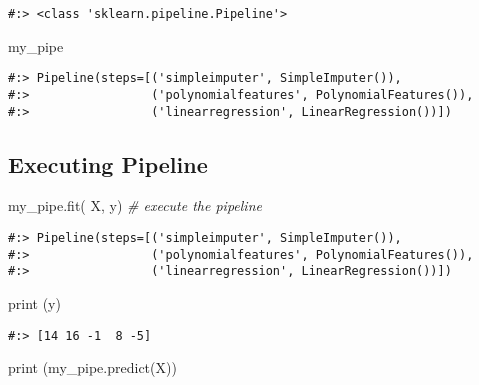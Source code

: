 \documentclass[
]{book}
\newenvironment{Shaded}{\begin{snugshade}}{\end{snugshade}}
\newcommand{\BuiltInTok}[1]{#1}
\newcommand{\CommentTok}[1]{\textcolor[rgb]{0.37,0.37,0.37}{\textit{#1}}}
\newcommand{\NormalTok}[1]{#1}
\begin{document}
\begin{verbatim}
#:> <class 'sklearn.pipeline.Pipeline'>
\end{verbatim}

\begin{Shaded}
\begin{Highlighting}[]
\NormalTok{my\_pipe}
\end{Highlighting}
\end{Shaded}

\begin{verbatim}
#:> Pipeline(steps=[('simpleimputer', SimpleImputer()),
#:>                 ('polynomialfeatures', PolynomialFeatures()),
#:>                 ('linearregression', LinearRegression())])
\end{verbatim}

\hypertarget{executing-pipeline}{%
\subsection{Executing Pipeline}\label{executing-pipeline}}

\begin{Shaded}
\begin{Highlighting}[]
\NormalTok{my\_pipe.fit( X, y) }\CommentTok{\# execute the pipeline}
\end{Highlighting}
\end{Shaded}

\begin{verbatim}
#:> Pipeline(steps=[('simpleimputer', SimpleImputer()),
#:>                 ('polynomialfeatures', PolynomialFeatures()),
#:>                 ('linearregression', LinearRegression())])
\end{verbatim}

\begin{Shaded}
\begin{Highlighting}[]
\BuiltInTok{print}\NormalTok{ (y)}
\end{Highlighting}
\end{Shaded}

\begin{verbatim}
#:> [14 16 -1  8 -5]
\end{verbatim}

\begin{Shaded}
\begin{Highlighting}[]
\BuiltInTok{print}\NormalTok{ (my\_pipe.predict(X))}
\end{Highlighting}
\end{Shaded}
\end{document}
